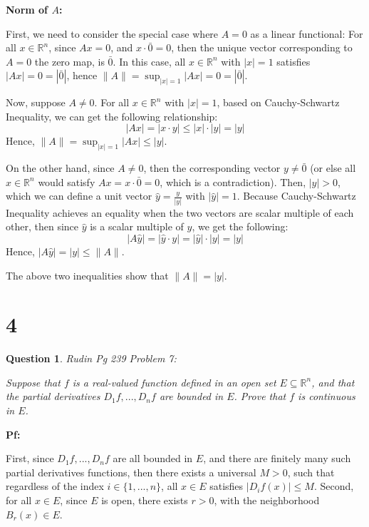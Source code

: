 \documentclass{article}
\newtheorem{question}{Question}
\begin{document}
\hfil

\textbf{Norm of $A$:}

First, we need to consider the special case where $A=0$ as a linear functional: For all $x\in\mathbb{R}^n$, since $Ax=0$, and $x\cdot \bar{0}=0$, then the unique vector corresponding to $A=0$ the zero map, is $\bar{0}$.
In this case, all $x\in\mathbb{R}^n$ with $|x|=1$ satisfies $|Ax|=0=|\bar{0}|$, hence $\|A\|=\sup_{|x|=1}|Ax|=0=|\bar{0}|$.

Now, suppose $A\neq 0$. For all $x\in\mathbb{R}^n$ with $|x|=1$, based on Cauchy-Schwartz Inequality, we can get the following relationship:
$$|Ax| = |x\cdot y|\leq |x|\cdot |y|=|y|$$
Hence, $\|A\|=\sup_{|x|=1}|Ax|\leq |y|$.

On the other hand, since $A\neq 0$, then the corresponding vector $y\neq\bar{0}$ (or else all $x\in\mathbb{R}^n$ would satisfy $Ax = x\cdot \bar{0}=0$, which is a contradiction). Then, $|y|>0$, which we can define a unit vector $\hat{y}=\frac{y}{|y|}$ with $|\hat{y}|=1$.
Because Cauchy-Schwartz Inequality achieves an equality when the two vectors are scalar multiple of each other, then since $\hat{y}$ is a scalar multiple of $y$, we get the following:
$$|A\hat{ y}|=|\hat{y}\cdot y| = |\hat{y}|\cdot |y|=|y|$$
Hence, $|A\hat{y}|=|y|\leq \|A\|$.

The above two inequalities show that $\|A\|=|y|$.

\break

\section*{4}
\begin{myBox}[]{}
    \begin{question}
        Rudin Pg 239 Problem 7:

        Suppose that $f$ is a real-valued function defined in an open set $E\subseteq \mathbb{R}^n$, and that the partial derivatives $D_1f, ..., D_nf$ are bounded in $E$.
        Prove that $f$ is continuous in $E$.
    \end{question}
\end{myBox}

\textbf{Pf:}

First, since $D_1f,...,D_nf$ are all bounded in $E$, and there are finitely many such partial derivatives functions, then there exists a universal $M>0$, such that regardless of the index $i\in\{1,...,n\}$,
all $x\in E$ satisfies $|D_if(x)|\leq M$.
Second, for all $x\in E$, since $E$ is open, there exists $r>0$, with the neighborhood $B_r(x)\in E$.
\end{document}
